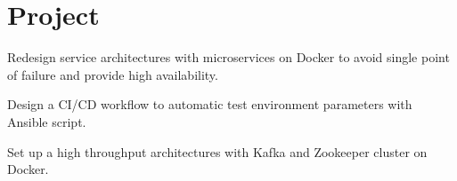 \documentclass[]{deedy-resume-openfont}
\begin{document}
\begin{minipage}[t]{0.45\textwidth}
\section{Project}

\vspace{\topsep} %
\begin{tightemize}
    \item Redesign service architectures with microservices on Docker to avoid single point of failure and provide high availability.
    \item Design a CI/CD workflow to automatic test environment parameters with Ansible script.
    \item Set up a high throughput architectures with Kafka and Zookeeper cluster on Docker.
\end{tightemize}
\sectionsep


%
%

\end{minipage}
\hfill
\end{document}
